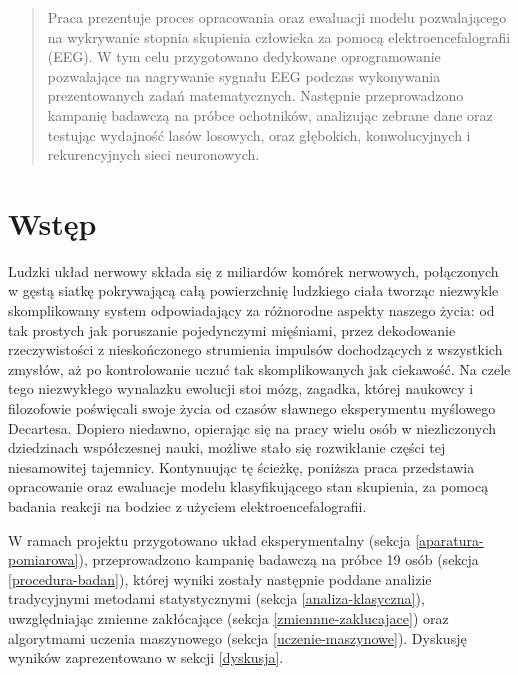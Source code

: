 \documentclass{./assets/wfis}
\begin{document}

\stronatytulowa

\begin{abstract}
Praca prezentuje proces opracowania oraz ewaluacji modelu pozwalającego na wykrywanie stopnia skupienia człowieka za pomocą elektroencefalografii (EEG). W tym celu przygotowano dedykowane oprogramowanie pozwalające na nagrywanie sygnału EEG podczas wykonywania prezentowanych zadań matematycznych. Następnie przeprowadzono kampanię badawczą na próbce ochotników, analizując zebrane dane oraz testując wydajność lasów losowych, oraz głębokich, konwolucyjnych i rekurencyjnych sieci neuronowych.
\end{abstract}

\chapter{Wstęp}
Ludzki układ nerwowy składa się z miliardów komórek nerwowych, połączonych w gęstą siatkę pokrywającą całą powierzchnię ludzkiego ciała tworząc niezwykle skomplikowany system odpowiadający za różnorodne aspekty naszego życia: od tak prostych jak poruszanie pojedynczymi mięśniami, przez dekodowanie rzeczywistości z nieskończonego strumienia impulsów dochodzących z wszystkich zmysłów, aż po kontrolowanie uczuć tak skomplikowanych jak ciekawość. Na czele tego niezwykłego wynalazku ewolucji stoi mózg, zagadka, której naukowcy i filozofowie poświęcali swoje życia od czasów sławnego eksperymentu myślowego Decartesa. Dopiero niedawno, opierając się na pracy wielu osób w niezliczonych dziedzinach współczesnej nauki, możliwe stało się rozwikłanie części tej niesamowitej tajemnicy. Kontynuując tę ścieżkę, poniższa praca przedstawia opracowanie oraz ewaluacje modelu klasyfikującego stan skupienia, za pomocą badania reakcji na bodziec z użyciem elektroencefalografii. 

W ramach projektu przygotowano układ eksperymentalny (sekcja \ref{aparatura-pomiarowa}), przeprowadzono kampanię badawczą na próbce 19 osób (sekcja \ref{procedura-badan}), której wyniki zostały następnie poddane analizie tradycyjnymi metodami statystycznymi (sekcja \ref{analiza-klasyczna}), uwzględniając zmienne zakłócające (sekcja \ref{zmiennne-zaklucajace}) oraz algorytmami uczenia maszynowego (sekcja \ref{uczenie-maszynowe}). Dyskusję wyników zaprezentowano w sekcji \ref{dyskusja}.
\end{document}
